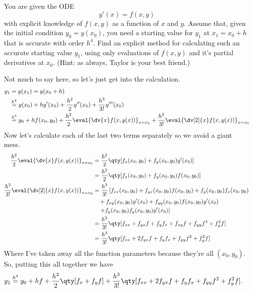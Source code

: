 \documentclass[boxes,pages]{homework}
\newcommand{\eqorder}[1]{\overset{h^#1}{=}}
\begin{document}
\begin{problem}
You are given the ODE
\[
	y'(x) = f(x, y)
\]
with explicit knowledge of $f(x, y)$ as a function of $x$ and $y$. Assume that, given the initial condition $y_0 = y(x_0)$, you need a starting value for $y_1$ at $x_1 = x_0 + h$ that is accurate with order $h^4$. Find an explicit method for calculating such an accurate starting value $y_1$, using only evaluations of $f(x, y)$ and it's partial derivatives at $x_0$. (Hint: as always, Taylor is your best friend.)
\end{problem}

\begin{solution}
	Not much to say here, so let's just get into the calculation.
	\begin{align*}
		y_1 & = y(x_1) = y(x_0 + h)                                                                                                                \\
		    & \eqorder{4} y(x_0) + hy'(x_0) + \frac{h^2}{2}y''(x_0) + \frac{h^3}{3!}y'''(x_0)                                                      \\
		    & \eqorder{4} y_0 + hf(x_0, y_0) + \frac{h^2}{2}\eval{\dv{x}f(x, y(x))}_{x = x_0} + \frac{h^3}{3!}\eval{\dv[2]{x}f(x, y(x))}_{x = x_0}
	\end{align*}
	Now let's calculate each of the last two terms separately so we avoid a giant mess.
	\begin{align*}
		\frac{h^2}{2}\eval{\dv{x}f(x, y(x))}_{x = x_0}     & = \frac{h^2}{2}\qty[f_x(x_0, y_0) + f_y(x_0, y_0)y'(x_0)]                                                \\
		                                                   & = \frac{h^2}{2}\qty[f_x(x_0, y_0) + f_y(x_0, y_0)f(x_0, y_0)]                                            \\
		\frac{h^3}{3!}\eval{\dv[2]{x}f(x, y(x))}_{x = x_0} & = \frac{h^3}{3!}\left[f_{xx}(x_0, y_0) + f_{yx}(x_0, y_0)f(x_0, y_0) + f_y(x_0, y_0)f_x(x_0, y_0)\right. \\
		                                                   & \quad + f_{xy}(x_0, y_0)y'(x_0) + f_{yy}(x_0, y_0)f(x_0, y_0)y'(x_0)                                     \\
		                                                   & \quad \left. + f_y(x_0, y_0)f_y(x_0, y_0)y'(x_0)\right]                                                  \\
		                                                   & = \frac{h^3}{3!}\qty[f_{xx} + f_{yx}f + f_yf_x + f_{xy}f + f_{yy}f^2 + f_y^2f]                           \\
		                                                   & = \frac{h^3}{3!}\qty[f_{xx} + 2f_{yx}f + f_yf_x + f_{yy}f^2 + f_y^2f]
	\end{align*}
	Where I've taken away all the function parameters because they're all $(x_0, y_0)$.
	So, putting this all together we have
	\begin{align*}
		y_1 & \eqorder{4} y_0 + hf + \frac{h^2}{2}\qty[f_x + f_yf] + \frac{h^3}{3!}\qty[f_{xx} + 2f_{yx}f + f_yf_x + f_{yy}f^2 + f_y^2f].
	\end{align*}
\end{solution}
\end{document}

